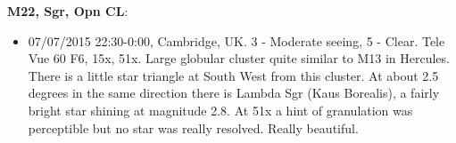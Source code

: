 {\bf M22, Sgr, Opn CL}:
\begin{itemize}
\item 07/07/2015 22:30-0:00, Cambridge, UK. 3 - Moderate seeing, 5 - Clear. Tele Vue 60 F6, 15x, 51x. Large globular cluster quite similar to M13 in Hercules. There is a little star triangle at South West from this cluster. At about 2.5 degrees in the same direction there is Lambda Sgr (Kaus Borealis), a fairly bright star shining at magnitude 2.8. At 51x a hint of granulation was perceptible but no star was really resolved. Really beautiful.
\end{itemize}
